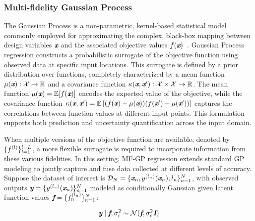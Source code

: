 \subsubsection{Multi-fidelity Gaussian Process}
\label{s:MFGP}

The Gaussian Process is a non-parametric, kernel-based statistical model commonly employed for approximating the complex, black-box mapping between design variables $\textbf{\em x}$ and the associated objective values $f(\textbf{\em x})$~\cite{williams1995gaussian, schulz2018tutorial}. Gaussian Process regression constructs a probabilistic surrogate of the objective function using observed data at specific input locations. This surrogate is defined by a prior distribution over functions, completely characterized by a mean function $\mu(\textbf{\em x}) : \mathcal{X} \rightarrow \mathbb{R}$ and a covariance function $\kappa(\textbf{\em x}, \textbf{\em x}') : \mathcal{X} \times \mathcal{X} \rightarrow \mathbb{R}$. The mean function $\mu(\textbf{\em x}) = \mathbb{E}[f(\textbf{\em x})]$ encodes the expected value of the objective, while the covariance function $\kappa(\textbf{\em x}, \textbf{\em x}') = \mathbb{E} \left[ (f(\textbf{\em x})-\mu(\textbf{\em x}))(f(\textbf{\em x}')-\mu(\textbf{\em x}')) \right]$ captures the correlations between function values at different input points. This formulation supports both prediction and uncertainty quantification across the input domain.

When multiple versions of the objective function are available, denoted by $\{f^{(l)}\}_{l=1}^{l = L}$, a more flexible surrogate is required to incorporate information from these various fidelities. In this setting, MF-GP regression extends standard GP modeling to jointly capture and fuse data collected at different levels of accuracy. Suppose the dataset of interest is $\mathcal{D}_{N} = \{ \textbf{\em x}_{n}, y^{(l_{n})}(\textbf{\em x}_{n}), l_{n} \}_{n=1}^{N}$, with observed outputs $\textbf{\em y} = \{ y^{(l_{n})}(\textbf{\em x}_{n}) \}_{n=1}^{N}$ modeled as conditionally Gaussian given latent function values $\textbf{\em f} = \{ f^{(l_{n})}_{n} \}_{n=1}^{N}$:

\begin{equation}\label{e:MFGP0}
	\textbf{\em y} \mid \textbf{\em f}, \sigma_{\epsilon}^2 \sim \mathcal{N}(\textbf{\em f}, \sigma_{\epsilon}^2 \textbf{\em I})
\end{equation}

